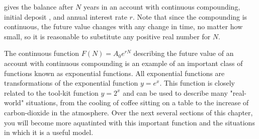 \documentclass[10pt,]{book}
\theoremstyle{plain}
\theoremstyle{definition}
\theoremstyle{definition}
\theoremstyle{definition}
\numberwithin{equation}{section}
\begin{document}
gives the balance after \(N\) years in an account with continuous compounding, initial deposit , and annual interest rate \(r\).  Note that since the compounding is continuous, the future value changes with any change in time, no matter how small, so it is reasonable to substitute any positive real number for \(N\).%
\par
The continuous function \(F(N)=A_0 e^{rN}\) describing the future value of an account with continuous compounding is an example of an important class of functions known as exponential functions.  All exponential functions are transformations of the exponential function \(y=e^x\).  This function is closely related to the tool-kit function \(y=2^x\) and can be used to describe many "real-world" situations, from the cooling of coffee sitting on a table to the increase of carbon-dioxide in the atmosphere.  Over the next several sections of this chapter, you will become more aquatinted with this important function and the situations in which it is a useful model.%
\typeout{************************************************}
\typeout{************************************************}
\end{document}
